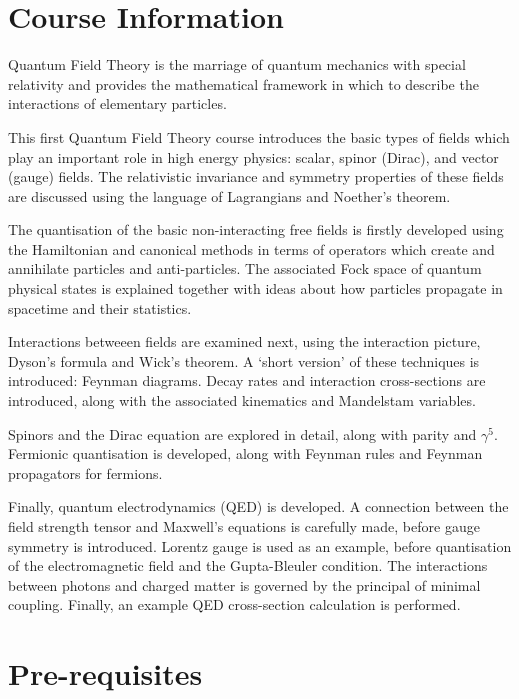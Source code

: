 \documentclass[a4paper,11pt]{article}
\begin{document}
	\maketitlepage
	\preliminaries

	\section*{Course Information}
	
	\noindent Quantum Field Theory is the marriage of quantum mechanics with special relativity and provides the mathematical framework in which to describe the interactions of elementary particles.

	\noindent This first Quantum Field Theory course introduces the basic types of fields which play an important role in high energy physics: scalar, spinor (Dirac), and vector (gauge) fields. The relativistic invariance and symmetry properties of these fields are discussed using the language of Lagrangians and Noether’s theorem.

	\noindent The quantisation of the basic non-interacting free fields is firstly developed using the Hamiltonian and canonical methods in terms of operators which create and annihilate particles and anti-particles. The associated Fock space of quantum physical states is explained together with ideas about how particles propagate in spacetime and their statistics.

	\noindent Interactions betweeen fields are examined next, using the interaction picture, Dyson’s formula and Wick’s theorem. A ‘short version’ of these techniques is introduced: Feynman diagrams. Decay rates and interaction cross-sections are introduced, along with the associated kinematics and Mandelstam variables.

	\noindent Spinors and the Dirac equation are explored in detail, along with parity and $\gamma^{5}$. Fermionic quantisation is developed, along with Feynman rules and Feynman propagators for fermions.

	\noindent Finally, quantum electrodynamics (QED) is developed. A connection between the field strength tensor and Maxwell’s equations is carefully made, before gauge symmetry is introduced. Lorentz gauge is used as an example, before quantisation of the electromagnetic field and the Gupta-Bleuler condition. The interactions between photons and charged matter is governed by the principal of minimal coupling. Finally, an example QED cross-section calculation is performed.

	\section*{Pre-requisites}
\end{document}
